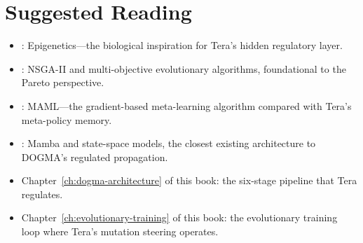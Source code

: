 \section*{Suggested Reading}
\begin{itemize}[leftmargin=1.5em]
  \item \citet{allis2016}: Epigenetics---the biological inspiration for Tera's hidden regulatory layer.
  \item \citet{deb2002}: NSGA-II and multi-objective evolutionary algorithms, foundational to the Pareto perspective.
  \item \citet{finn2017}: MAML---the gradient-based meta-learning algorithm compared with Tera's meta-policy memory.
  \item \citet{gu2023mamba}: Mamba and state-space models, the closest existing architecture to DOGMA's regulated propagation.
  \item Chapter~\ref{ch:dogma-architecture} of this book: the six-stage pipeline that Tera regulates.
  \item Chapter~\ref{ch:evolutionary-training} of this book: the evolutionary training loop where Tera's mutation steering operates.
\end{itemize}
